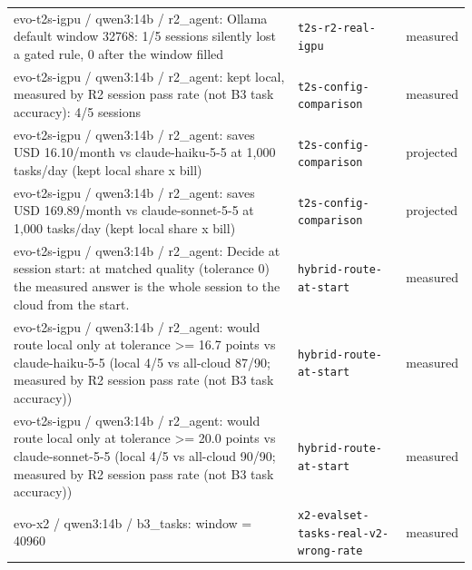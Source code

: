 \begin{longtable}{>{\raggedright\arraybackslash}p{}>{\raggedright\arraybackslash}p{}>{\raggedright\arraybackslash}p{}}
\small evo-t2s-igpu / qwen3:14b / r2\_agent: Ollama default window 32768: 1/5 sessions silently lost a gated rule, 0 after the window filled & {\footnotesize \texttt{t2s-\allowbreak{}r2-\allowbreak{}real-\allowbreak{}igpu}} & \small measured \\

\small evo-t2s-igpu / qwen3:14b / r2\_agent: kept local, measured by R2 session pass rate (not B3 task accuracy): 4/5 sessions & {\footnotesize \texttt{t2s-\allowbreak{}config-\allowbreak{}comparison}} & \small measured \\

\small evo-t2s-igpu / qwen3:14b / r2\_agent: saves USD 16.10/month vs claude-haiku-5-5 at 1,000 tasks/day (kept local share x bill) & {\footnotesize \texttt{t2s-\allowbreak{}config-\allowbreak{}comparison}} & \small projected \\

\small evo-t2s-igpu / qwen3:14b / r2\_agent: saves USD 169.89/month vs claude-sonnet-5-5 at 1,000 tasks/day (kept local share x bill) & {\footnotesize \texttt{t2s-\allowbreak{}config-\allowbreak{}comparison}} & \small projected \\

\small evo-t2s-igpu / qwen3:14b / r2\_agent: Decide at session start: at matched quality (tolerance 0) the measured answer is the whole session to the cloud from the start. & {\footnotesize \texttt{hybrid-\allowbreak{}route-\allowbreak{}at-\allowbreak{}start}} & \small measured \\

\small evo-t2s-igpu / qwen3:14b / r2\_agent: would route local only at tolerance \textgreater{}= 16.7 points vs claude-haiku-5-5 (local 4/5 vs all-cloud 87/90; measured by R2 session pass rate (not B3 task accuracy)) & {\footnotesize \texttt{hybrid-\allowbreak{}route-\allowbreak{}at-\allowbreak{}start}} & \small measured \\

\small evo-t2s-igpu / qwen3:14b / r2\_agent: would route local only at tolerance \textgreater{}= 20.0 points vs claude-sonnet-5-5 (local 4/5 vs all-cloud 90/90; measured by R2 session pass rate (not B3 task accuracy)) & {\footnotesize \texttt{hybrid-\allowbreak{}route-\allowbreak{}at-\allowbreak{}start}} & \small measured \\

\small evo-x2 / qwen3:14b / b3\_tasks: window = 40960 & {\footnotesize \texttt{x2-\allowbreak{}evalset-\allowbreak{}tasks-\allowbreak{}real-\allowbreak{}v2-\allowbreak{}wrong-\allowbreak{}rate}} & \small measured \\


\end{longtable}
